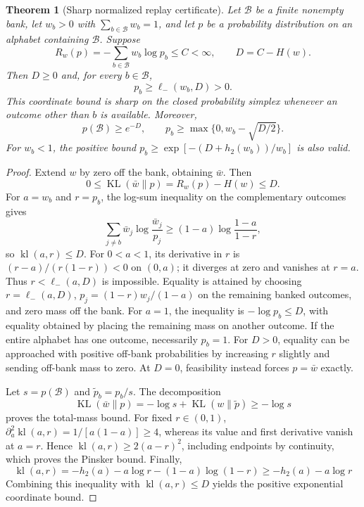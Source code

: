 \documentclass{article}
\newcommand{\1}{\mathbf 1}
\newtheorem{theorem}[lemma]{Theorem}
\theoremstyle{remark}
\theoremstyle{definition}
\theoremstyle{plain}
\begin{document}
\begin{theorem}[Sharp normalized replay certificate]
\label{ext:sharp-replay-certificate}
Let $\mathcal B$ be a finite nonempty bank, let $w_b>0$ with
$\sum_{b\in\mathcal B}w_b=1$, and let $p$ be a probability distribution on
an alphabet containing $\mathcal B$. Suppose
\[
 R_w(p)=-\sum_{b\in\mathcal B}w_b\log p_b\le C<\infty,
 \qquad D=C-H(w).
\]
Then $D\ge0$ and, for every $b\in\mathcal B$,
\begin{equation}
 \label{ext:binary-kl-retention}
 p_b\ge\ell_-(w_b,D)>0.
\end{equation}
This coordinate bound is sharp on the closed probability simplex whenever
an outcome other than $b$ is available. Moreover,
\[
 p(\mathcal B)\ge e^{-D},\qquad
 p_b\ge\max\{0,w_b-\sqrt{D/2}\}.
\]
For $w_b<1$, the positive bound
$p_b\ge\exp[-(D+h_2(w_b))/w_b]$ is also valid.
\end{theorem}
\begin{proof}
Extend $w$ by zero off the bank, obtaining $\bar w$. Then
\[
 0\le\operatorname{KL}(\bar w\|p)=R_w(p)-H(w)\le D.
\]
For $a=w_b$ and $r=p_b$, the log-sum inequality on the complementary
outcomes gives
\[
 \sum_{j\ne b}\bar w_j\log\frac{\bar w_j}{p_j}
 \ge(1-a)\log\frac{1-a}{1-r},
\]
so $\operatorname{kl}(a,r)\le D$. For $0<a<1$, its derivative in $r$ is
$(r-a)/(r(1-r))<0$ on $(0,a)$; it diverges at zero and vanishes at $r=a$.
Thus $r<\ell_-(a,D)$ is impossible. Equality is attained by choosing
$r=\ell_-(a,D)$, $p_j=(1-r)w_j/(1-a)$ on the remaining banked outcomes,
and zero mass off the bank. For $a=1$, the inequality is
$-\log p_b\le D$, with equality obtained by placing the remaining mass on
another outcome. If the entire alphabet has one outcome, necessarily
$p_b=1$. For $D>0$, equality can be approached with positive off-bank
probabilities by increasing $r$ slightly and sending off-bank mass to zero. At $D=0$, feasibility
instead forces $p=\bar w$ exactly.

Let $s=p(\mathcal B)$ and $\widetilde p_b=p_b/s$. The decomposition
\[
 \operatorname{KL}(\bar w\|p)
 =-\log s+\operatorname{KL}(w\|\widetilde p)\ge-\log s
\]
proves the total-mass bound. For fixed $r\in(0,1)$,
$\partial_a^2\operatorname{kl}(a,r)=1/[a(1-a)]\ge4$, whereas its value
and first derivative vanish at $a=r$. Hence
$\operatorname{kl}(a,r)\ge2(a-r)^2$, including endpoints by continuity,
which proves the Pinsker bound. Finally,
\[
 \operatorname{kl}(a,r)
 =-h_2(a)-a\log r-(1-a)\log(1-r)
 \ge-h_2(a)-a\log r
\]
Combining this inequality with $\operatorname{kl}(a,r)\le D$ yields the
positive exponential coordinate bound.
\end{proof}
\end{document}
